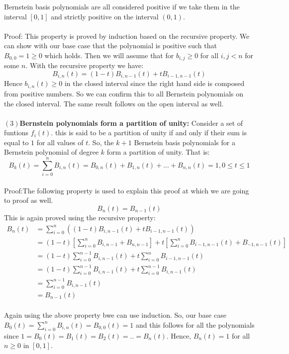 \documentclass{article}
\begin{document}
Bernstein basis polynomials are all considered positive if we take them in the interval $[0,1]$ and strictly positive on the interval $(0,1)$.\paragraph{}
Proof: This property is proved by induction based on the recursive property.
We can show with our base case that the polynomial is positive such that $B_{0,0}=1\geq0$ which holds. Then we will assume that for $b_{i,j}\geq0$ for all $i,j<n$ for some $n$. With the recursive property we have:
\begin{equation}
B_{i,n}(t)=(1-t)B_{i,n-1}(t)+tB_{i-1,n-1}(t)    
\end{equation}
Hence $b_{i,n}(t)\geq0$ in the closed interval since the right hand side is composed from positive numbers. So we can confirm this to all Bernstein polynomials on the closed interval. The same result follows on the open interval as well.\paragraph{}
\textbf{$(3)$Bernstein polynomials form a partition of unity:}
Consider a set of funtions $f_i(t)$. this is said to be a partition of unity if and only if their sum is equal to $1$ for all values of $t$. So, the $k + 1$ Bernstein basis polynomials for a Bernstein polynomial of degree $k$ form a partition of unity. That is:
\begin{equation}
B_k(t)=\sum_{i=0}^nB_{i,n}(t)= B_{0,n}(t)+B_{1,n}(t)+...+B_{n,n}(t)=1,  0\leq t\leq 1  
\end{equation}\paragraph{}
Proof:The following property is used to explain this proof at which we are going to proof as well.
\begin{equation}
B_n(t)=B_{n-1}(t)    
\end{equation}
This is again proved using the recursive property:
\begin{align*}
B_n(t)&=\sum_{i=0}^n((1-t)B_{i,n-1}(t)+tB_{i-1,n-1}(t))\\
&=(1-t)\left[\sum_{i=0}^nB_{i,n-1}+B_{n,n-1}\right]+t\left[\sum_{i=0}^nB_{i-1,n-1}(t)+B_{-1,n-1}(t)\right]\\
&=(1-t)\sum_{i=0}^{n-1}B_{i,n-1}(t)+t\sum_{i=0}^{n}B_{i-1,n-1}(t)\\
&=(1-t)\sum_{i=0}^{n-1}B_{i,n-1}(t)+t\sum_{i=0}^{n-1}B_{i,n-1}(t)\\
&=\sum_{i=0}^{n-1}B_{i,n-1}(t)\\
&=B_{n-1}(t)
\end{align*}\paragraph{}
Again using the above property bwe can use induction. So, our base case $B_0(t)=\sum_{i=0}^nB_{i,n}(t)=B_{0,0}(t)=1$ and this follows for all the polynomials since $1=B_0(t)=B_1(t)=B_2(t)=..=B_n(t)$. Hence, $B_n(t)=1$ for all $n\geq0$ in $[0,1]$.
\end{document}
